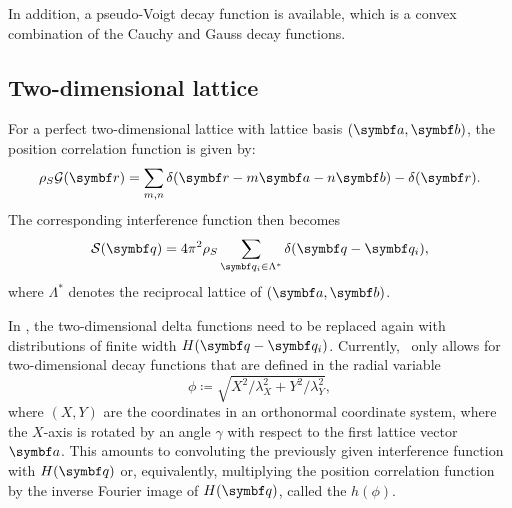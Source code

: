 In addition, a pseudo-Voigt decay function is available,
which is a convex combination of the Cauchy and Gauss decay functions.

\subsection{Two-dimensional lattice} \label{sec:sect:2dlattice}

For a perfect two-dimensional lattice with lattice basis $(\v a,\v b)$, the position
correlation function is given by:
\begin{equation}
  \rho_S\GD(\r) = \sum_{m,n} \delta(\r-m\v a - n\v b) - \delta(\r).
\end{equation}
The corresponding interference function then becomes
\begin{equation}
  \SD(\q) = 4\pi^2 \rho_S \sum_{\q_i\in\Lambda^*} \delta(\q - \q_i),
\end{equation}
where $\Lambda^*$ denotes the reciprocal lattice of $(\v a,\v b)$.

In \BornAgain, the two-dimensional delta functions need to be replaced again with
distributions of finite width $H(\q - \q_i)$. Currently, \BornAgain\ only allows for two-dimensional
decay functions that are defined in the radial variable
\begin{equation}
  \phi \coloneqq \sqrt{X^2/\lambda_X^2 + Y^2/\lambda_Y^2},
\end{equation}
where $(X,Y)$ are the coordinates in an orthonormal coordinate system,
where the $X$-axis is rotated
by an angle $\gamma$ with respect to the first lattice vector $\v a$.
This amounts to convoluting the
previously given interference function with $H(\q)$ or, equivalently, multiplying
the position correlation function by the inverse Fourier image of $H(\q)$, called the
 $h(\phi)$.

